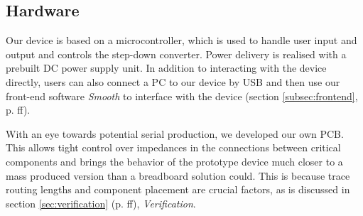 \subsection{Hardware}

Our device is based  on a microcontroller, which is used  to handle user input
and output and  controls the step-down converter.  Power  delivery is realised
with a  prebuilt DC  power supply  unit. In addition  to interacting  with the
device directly, users can also connect a PC to our device by USB and then use
our front-end  software \emph{Smooth}  to interface  with the  device (section
\ref{subsec:frontend}, p. \pageref{subsec:frontend}ff).

With an eye towards  potential serial production, we developed our own PCB. This
allows  tight  control  over impedances  in  the  connections  between  critical
components and brings the behavior of the prototype device much closer to a mass
produced version than a breadboard solution could. This is because trace routing
lengths and component placement are  crucial factors, as is discussed in section
\ref{sec:verification}  (p.  \pageref{sec:verification}ff), \emph{Verification}.
